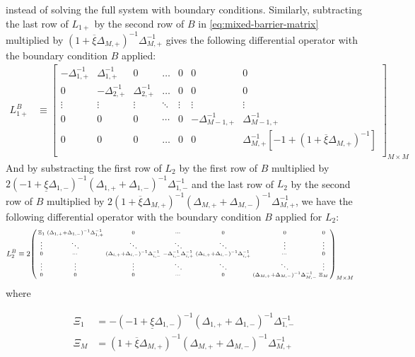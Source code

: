 \documentclass[11pt]{article}
\newenvironment{psmallmatrix}
{\left(\begin{smallmatrix}}
	{\end{smallmatrix}\right)}
\theoremstyle{definition}
\begin{document}
instead of solving the full system with boundary conditions. Similarly, subtracting the last row of $L_{1+}$ by the second row of $B$ in \eqref{eq:mixed-barrier-matrix} multiplied by $(1 + \overline{\xi} \Delta_{M,+})^{-1} \Delta_{M,+}^{-1}$ gives the following differential operator with the boundary condition $B$ applied:
\begin{align}
L_{1+}^B &\equiv \begin{bmatrix}
-\Delta_{1,+}^{-1}&\Delta_{1,+}^{-1}&0&\dots&0&0&0\\
0&-\Delta_{2,+}^{-1}&\Delta_{2,+}^{-1}&\dots&0&0&0\\
\vdots&\vdots&\vdots&\ddots&\vdots&\vdots&\vdots\\
0&0&0&\cdots&0&-\Delta_{M-1,+}^{-1}&\Delta_{M-1,+}^{-1}\\
0&0&0&\dots&0&0&\Delta_{M,+}^{-1}  [-1 + (1 + \overline{\xi} \Delta_{M,+})^{-1}]  \\
\end{bmatrix}_{M\times M}\label{eq:L-1-plus}
\end{align}
And by substracting the first row of $L_2$ by the first row of $B$ multiplied by $2(-1 + \underline{\xi} \Delta_{1,-} )^{-1} (\Delta_{1,+} + \Delta_{1,-})^{-1}  \Delta_{1,-}^{-1} $ and the last row of $L_2$ by the second row of $B$ multiplied by $2(1 + \overline{\xi} \Delta_{M,+} )^{-1} (\Delta_{M,+} + \Delta_{M,-})^{-1}  \Delta_{M,+}^{-1}$, we have the following differential operator with the boundary condition $B$ applied for $L_2$:
\begin{align}
L_2^B &\equiv 2 \begin{psmallmatrix}
\Xi_1 &
(\Delta_{1,+}+\Delta_{1,-})^{-1} \Delta_{1,+}^{-1}
&0&\cdots&0&0&0 \\
\vdots&\ddots&\ddots&\ddots&\ddots&\vdots&\vdots\\
0&\cdots&
(\Delta_{i,+}+\Delta_{i,-})^{-1} \Delta_{i,-}^{-1} &
-\Delta_{i,-}^{-1} \Delta_{i,+}^{-1}  &
 (\Delta_{i,+}+\Delta_{i,-})^{-1} \Delta_{i,+}^{-1}&\cdots&0 \\
\vdots&\vdots&\vdots&\ddots&\ddots&\ddots&\vdots\\
0&0&0&\cdots&0&(\Delta_{M,+}+\Delta_{M,-})^{-1} \Delta_{M,-}^{-1}&\Xi_M
\end{psmallmatrix}_{M\times M}\label{eq:L-2} 
\end{align}
where

\begin{align}
\Xi_{1} &= - (-1 + \underline{\xi} \Delta_{1,-})^{-1} (\Delta_{1,+} + \Delta_{1,-})^{-1}  \Delta_{1,-}^{-1} \\
\Xi_{M} &=  (1 + \overline{\xi} \Delta_{M,+})^{-1} (\Delta_{M,+} + \Delta_{M,-})^{-1}  \Delta_{M,+}^{-1} 
\end{align}
\end{document}
